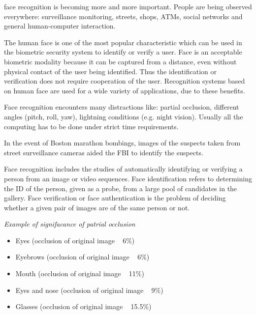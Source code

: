% 
% 
% 
% 

 face recognition is becoming more and more important. People are being observed everywhere: surveillance monitoring, streets, shops, ATMs, social networks and general human-computer interaction\cite{Forensics}.

The human face is one of the most popular
characteristic which can be used in the biometric security system
to identify or verify a user. Face is an acceptable biometric
modality because it can be captured from a distance, even
without physical contact of the user being identified. Thus the
identification or verification does not require cooperation of the
user. Recognition systems based on human face are used for a
wide variety of applications, due to these benefits\cite{Occlusion&noise}.

Face recognition encounters many distractions like: partial occlusion, different angles (pitch, roll, yaw), lightning conditions (e.g. night vision). Usually all the computing has to be done under strict time requirements.

In the event of Boston marathon bombings,
images of the suspects taken from street surveillance cameras
aided the FBI to identify the suspects.\cite{NYTimes}

Face recognition includes the studies of automatically
identifying or verifying a person from an image or video
sequences. Face identification refers to determining the ID of
the person, given as a probe, from a large pool of candidates
in the gallery. Face verification or face authentication is the problem of deciding whether a given pair of images are
of the same person or not\cite{Forensics}.


\emph{Example of signifacance of patrial occlusion}
\begin{itemize}
	\item Eyes (occlusion of original image ~ 6\%)
	\item Eyebrows (occlusion of original image ~ 6\%)
	\item Mouth (occlusion of original image ~ 11\%)
	\item Eyes and nose (occlusion of original image ~ 9\%)
	\item Glasses (occlusion of original image ~ 15.5\%)
\end{itemize} 

